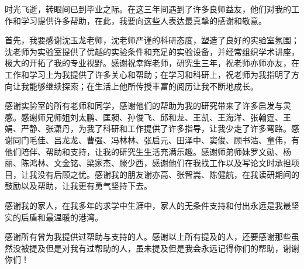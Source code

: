 时光飞逝，转眼间已到毕业之际。在这三年间遇到了许多良师益友，他们对我的工作和学习提供许多帮助，在此，我要向这些人表达最真挚的感谢和敬意。

首先，我要感谢沈玉龙老师，沈老师严谨的科研态度，塑造了良好的实验室氛围；沈老师为实验室提供了优越的实验条件和充足的实验设备，并经常组织学术讲座，极大的开拓了我的专业视野。感谢祝幸辉老师，研究生三年，祝老师亦师亦友，在工作和学习上为我提供了许多关心和帮助；在学习和科研上，祝老师为我指明了方向让我能够继续探索；在生活上他所传授丰富的阅历让我不断地成长。

感谢实验室的所有老师和同学，感谢他们的帮助为我的研究带来了许多启发与灵感。感谢师兄师姐刘太鹏、匡昶、孙俊飞、邱和龙、王凯、王海洋、张翰霆、王娟、严静、张潇丹，为我了科研和工作提供了许多指导，让我少走了许多弯路。感谢同门毛佳、吕龙龙、曹强、冯林林、张启元、田泽中、窦俊、顾书浩、童伟，有他们陪伴、帮助和支持，让我的研究生生活充满乐趣。感谢师弟师妹罗文勋、杨丽、陈鸿林、文金铭、梁家杰、滕少西，感谢他们在我找工作以及写论文时承担项目，让我没有后顾之忧。感谢我的朋友谢亦高、张智嵩、陈健航，在我读研期间的鼓励以及帮助，让我更有勇气坚持下去。

感谢我的家人，在我多年的求学中生涯中，家人的无条件支持和付出永远是我最坚实的后盾和最温暖的港湾。

感谢所有曾为我提供过帮助与支持的人。感谢以上所有提及的人，还要感谢那些虽然没被提及但是对我有过帮助的人，虽未提及但是我会永远记得你们的帮助，谢谢你们！

